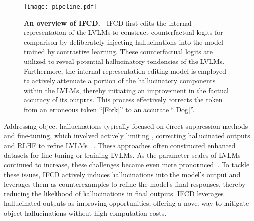 \begin{figure*}[ht!]
\vskip 0.2in
\begin{center}
\centerline{\texttt{[image: pipeline.pdf]}}
\caption{\textbf{An overview of IFCD.~} IFCD first edits the internal representation of the LVLMs to construct counterfactual logits for comparison by deliberately injecting hallucinations into the model trained by contrastive learning. These counterfactual logits are utilized to reveal potential hallucinatory tendencies of the LVLMs. Furthermore, the internal representation editing model is employed to actively attenuate a portion of the hallucinatory components within the LVLMs, thereby initiating an improvement in the factual accuracy of its outputs. This process effectively corrects the token from an erroneous token ``[Fork]'' to an accurate ``[Dog]''.}
\label{fig:pipe_line}
\vskip -0.3in
\end{center}
\end{figure*}

Addressing object hallucinations typically focused on direct suppression methods and fine-tuning, which involved actively limiting \cite{dhuliawala-etal-2024-chain}, correcting hallucinated outputs \cite{hu-etal-2024-knowledge} and RLHF to refine LVLMs ~\cite{ye2024mplug}. These approaches often constructed enhanced datasets for fine-tuning or training LVLMs. As the parameter scales of LVLMs continued to increase, these challenges became even more pronounced~\cite{Ye_2024_CVPR, zhu2024minigpt}. To tackle these issues, IFCD actively induces hallucinations into the model's output and leverages them as counterexamples to refine the model's final responses, thereby reducing the likelihood of hallucinations in final outputs. IFCD leverages hallucinated outputs as improving opportunities, offering a novel way to mitigate object hallucinations without high computation costs.
